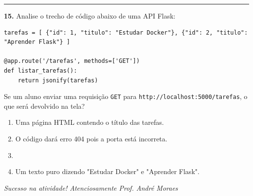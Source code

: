 \documentclass[12pt,a4paper]{article}
\newcommand{\correto}[1]{\iftoggle{gabarito}{\textcolor{corGabarito}{\textbf{#1}}}{#1}}
\begin{document}
\vspace{0.3cm}
\hrule
\vspace{0.3cm}
\textbf{15.} Analise o trecho de código abaixo de uma API Flask:
\begin{verbatim}
tarefas = [ {"id": 1, "titulo": "Estudar Docker"}, {"id": 2, "titulo": "Aprender Flask"} ]

@app.route('/tarefas', methods=['GET'])
def listar_tarefas():
    return jsonify(tarefas)
\end{verbatim}
Se um aluno enviar uma requisição \texttt{GET} para \texttt{http://localhost:5000/tarefas}, o que será devolvido na tela?
\begin{enumerate}[label=(\alph*)]
    \item Uma página HTML contendo o título das tarefas.
    \item O código dará erro 404 pois a porta está incorreta.
    \item \correto{Um arquivo JSON com a lista de tarefas e o status 200 OK.}
    \item Um texto puro dizendo "Estudar Docker" e "Aprender Flask".
\end{enumerate}

\vfill
\begin{center}
    \textit{Sucesso na atividade! Atenciosamente Prof. André Moraes}
\end{center}
\end{document}
